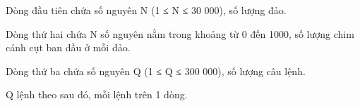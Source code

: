 Dòng đầu tiên chứa số nguyên N (1 ≤ N ≤ 30 000), số lượng đảo.  

   Dòng thứ hai chứa N số nguyên nằm trong khoảng từ 0 đến 1000, số lượng chim cánh cụt ban đầu ở mỗi đảo.  

   Dòng thứ ba chứa số nguyên Q (1 ≤ Q ≤ 300 000), số lượng câu lệnh.  

   Q lệnh theo sau đó, mỗi lệnh trên 1 dòng.  

\